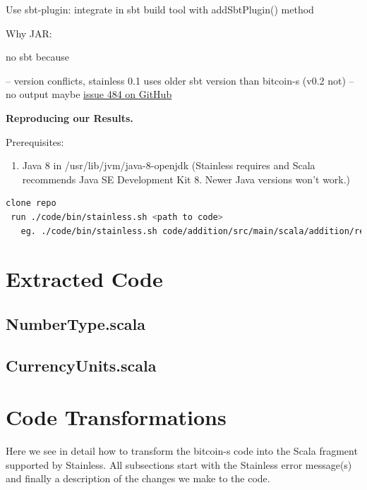 \documentclass[runningheads]{llncs}
\renewcommand{\paragraph}{\textbf}%
\begin{document}
Use sbt-plugin: integrate in sbt build tool with addSbtPlugin() method

Why JAR:


no sbt because

-- version conflicts, stainless 0.1 uses older sbt version than bitcoin-s (v0.2 not)
-- no output maybe \href{https://github.com/epfl-lara/stainless/issues/484}{issue 484 on
  GitHub}


\paragraph{Reproducing our Results.}

Prerequisites:
\begin{enumerate}
\item Java 8 in /usr/lib/jvm/java-8-openjdk (Stainless requires and Scala recommends Java SE Development Kit 8. Newer Java versions won't work.)
\end{enumerate}


\begin{lstlisting}[language=bash]
 clone repo
 run ./code/bin/stainless.sh <path to code>
   eg. ./code/bin/stainless.sh code/addition/src/main/scala/addition/reduced/
\end{lstlisting}



\section{Extracted Code}
\label{sec:extracted}

\subsection{NumberType.scala}


\subsection{CurrencyUnits.scala}



\section{Code Transformations} 
\label{sec:transform}

Here we see in detail how to transform the bitcoin-s code into the
Scala fragment supported by Stainless. All subsections start with the
Stainless error message(s) and finally a description of the changes we
make to the code.
\end{document}
